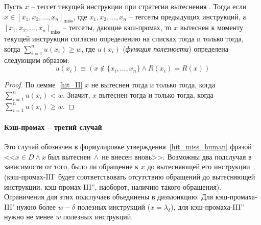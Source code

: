 \begin{lemma} Пусть $x$ -- тегсет текущей инструкции при
стратегии вытеснения \LRU. Тогда если $x \in [x_1, x_2, ...,
x_n]_{\mbox{miss}}$, где $x_1, x_2, ..., x_n$ -- тегсеты предыдущих
инструкций, а $[x_1, x_2, ..., x_n]_{\mbox{miss}}$ -- тегсеты,
дающие кэш-промах, то $x$ вытеснен к моменту текущей инструкции
согласно определению \LRU на списках тогда и только тогда, когда
$\sum^n_{i=1} u(x_i) \geqslant w$, где $u(x_i)$ (\emph{функция
полезности}) определена следующим образом:
$$u(x_i) \equiv (x \notin \{x_i, ..., x_n\} \wedge R(x_i) = R(x))$$
%

\end{lemma}
\begin{proof}
  По лемме~\ref{hit_II} $x$ не вытеснен тогда и только тогда, когда $\sum^n_{i=1} u(x_i) <
  w$. Значит, $x$ вытеснен тогда и только тогда, когда $\sum^n_{i=1} u(x_i) \geqslant
  w$.
\end{proof}



\paragraph{Кэш-промах -- третий случай} Это случай обозначен в
формулировке утверждения~\ref{hit_miss_human} фразой <<$x \in D
\wedge x~\mbox{был вытеснен}~\wedge~\mbox{не внесен вновь}$>>.
Возможны два подслучая в зависимости от того, было ли обращение к
$x$ до вытесняющей его инструкции (кэш-промах-III' будет
соответствовать отсутствию обращений до вытесняющей инструкции,
кэш-промах-III'', наоборот, наличию такого обращения). Ограничения
для этих подслучаев объединены в дизъюнкцию. Для кэш-промаха-III'
нужно более $w-\delta$ полезных инструкций ($x = \lambda_\delta$),
для кэш-промаха-III'' нужно не менее $w$ полезных инструкций.

